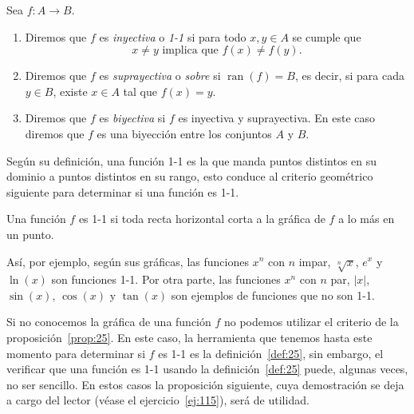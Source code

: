 \documentclass[12pt,a4paper]{book}
\DeclareMathOperator{\ran}{ran}
\begin{document}
    \begin{definicion}\label{def:25}
        Sea $f:A\to B$.
        \begin{enumerate}
            \item Diremos que $f$ es \textit{inyectiva} o \textit{1-1} si para todo $x,y\in A$ se cumple que
            \begin{equation*}
                x\neq y\text{ implica que }f(x)\neq f(y).
            \end{equation*}
            \item Diremos que $f$ es \textit{suprayectiva} o \textit{sobre} si $\ran(f)=B$, es decir, si para
            cada $y\in B$, existe $x\in A$ tal que $f(x)=y$.
            \item Diremos que $f$ es \textit{biyectiva} si $f$ es inyectiva y suprayectiva. En este caso
            diremos que $f$ es una biyección entre los conjuntos $A$ y $B$.
        \end{enumerate}
    \end{definicion}

    Según su definición, una función 1-1 es la que manda puntos distintos en
    su dominio a puntos distintos en su rango, esto conduce al criterio geométrico
    siguiente para determinar si una función es 1-1.

    \begin{proposicion}\label{prop:25}
        Una función $f$ es 1-1 si toda recta horizontal corta a
        la gráfica de $f$ a lo más en un punto.
    \end{proposicion}

    Así, por ejemplo, según sus gráficas, las funciones $x^{n}$ con $n$ impar, $\sqrt[n]{x}$,
    $e^{x}$ y $\ln(x)$ son funciones 1-1. Por otra parte, las funciones $x^{n}$ con $n$ par, $|x|$,
    $\sin(x)$, $\cos(x)$ y $\tan(x)$ son ejemplos de funciones que no son 1-1.

    Si no conocemos la gráfica de una función $f$ no podemos utilizar el criterio
    de la proposición~\ref{prop:25}. En este caso, la herramienta que tenemos hasta este
    momento para determinar si $f$ es 1-1 es la definición~\ref{def:25}, sin embargo, el
    verificar que una función es 1-1 usando la definición~\ref{def:25} puede, algunas veces,
    no ser sencillo. En estos casos la proposición siguiente, cuya demostración se
    deja a cargo del lector (véase el ejercicio~\ref{ej:115}), será de utilidad.
\end{document}
